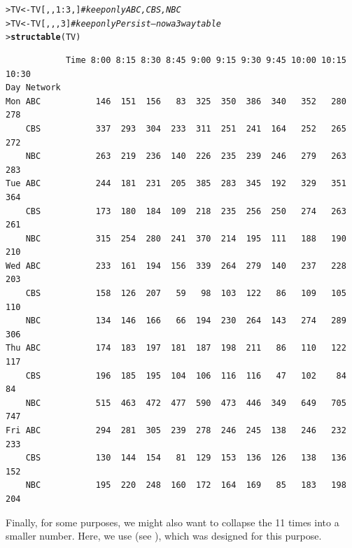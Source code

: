 \documentclass[10pt,krantz2]{krantz}\usepackage[]{graphicx}\usepackage[]{color}
\makeatletter
\newcommand{\hlnum}[1]{\textcolor[rgb]{0.686,0.059,0.569}{#1}}%
\newcommand{\hlcom}[1]{\textcolor[rgb]{0.678,0.584,0.686}{\textit{#1}}}%
\newcommand{\hlopt}[1]{\textcolor[rgb]{0,0,0}{#1}}%
\newcommand{\hlstd}[1]{\textcolor[rgb]{0.345,0.345,0.345}{#1}}%
\newcommand{\hlkwb}[1]{\textcolor[rgb]{0.69,0.353,0.396}{#1}}%
\newcommand{\hlkwd}[1]{\textcolor[rgb]{0.737,0.353,0.396}{\textbf{#1}}}%
\newenvironment{kframe}{%
 \def\at@end@of@kframe{}%
 \ifinner\ifhmode%
  \def\at@end@of@kframe{\end{minipage}}%
  \begin{minipage}{\columnwidth}%
 \fi\fi%
 \def\FrameCommand##1{\hskip\@totalleftmargin \hskip-\fboxsep
 \colorbox{shadecolor}{##1}\hskip-\fboxsep
     \hskip-\linewidth \hskip-\@totalleftmargin \hskip\columnwidth}%
 \MakeFramed {\advance\hsize-\width
   \@totalleftmargin\z@ \linewidth\hsize
   \@setminipage}}%
 {\par\unskip\endMakeFramed%
 \at@end@of@kframe}
\newenvironment{knitrout}{}{} %
\renewenvironment{knitrout}{\small\renewcommand{\baselinestretch}{.85}}{} %
\makeatother
\begin{document}
\begin{knitrout}\footnotesize
{}\color{fgcolor}\begin{kframe}
\begin{alltt}
\hlstd{> }\hlstd{TV} \hlkwb{<-} \hlstd{TV[,,}\hlnum{1}\hlopt{:}\hlnum{3}\hlstd{,]}     \hlcom{# keep only ABC, CBS, NBC}
\hlstd{> }\hlstd{TV} \hlkwb{<-} \hlstd{TV[,,,}\hlnum{3}\hlstd{]}       \hlcom{# keep only Persist -- now a 3 way table}
\hlstd{> }\hlkwd{structable}\hlstd{(TV)}
\end{alltt}
\begin{verbatim}
            Time 8:00 8:15 8:30 8:45 9:00 9:15 9:30 9:45 10:00 10:15 10:30
Day Network                                                               
Mon ABC           146  151  156   83  325  350  386  340   352   280   278
    CBS           337  293  304  233  311  251  241  164   252   265   272
    NBC           263  219  236  140  226  235  239  246   279   263   283
Tue ABC           244  181  231  205  385  283  345  192   329   351   364
    CBS           173  180  184  109  218  235  256  250   274   263   261
    NBC           315  254  280  241  370  214  195  111   188   190   210
Wed ABC           233  161  194  156  339  264  279  140   237   228   203
    CBS           158  126  207   59   98  103  122   86   109   105   110
    NBC           134  146  166   66  194  230  264  143   274   289   306
Thu ABC           174  183  197  181  187  198  211   86   110   122   117
    CBS           196  185  195  104  106  116  116   47   102    84    84
    NBC           515  463  472  477  590  473  446  349   649   705   747
Fri ABC           294  281  305  239  278  246  245  138   246   232   233
    CBS           130  144  154   81  129  153  136  126   138   136   152
    NBC           195  220  248  160  172  164  169   85   183   198   204
\end{verbatim}
\end{kframe}
\end{knitrout}

Finally, for some purposes, we might also want to collapse the 11 times into a smaller number.
Here, we use  (see ), which was designed for this purpose.

 
\end{document}
